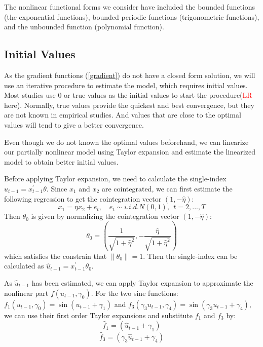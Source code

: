 \documentclass[a4paper,12pt,times,numbered,print,index]{report}
\numberwithin{equation}{section}
\begin{document}
The nonlinear functional forms we consider have included the bounded functions (the exponential functions), bounded periodic functions (trigonometric functions), and the unbounded function (polynomial function). 

\subsection{Initial Values}

As the gradient functions (\ref{gradient}) do not have a closed form solution, we will use an iterative procedure to estimate the model, which requires initial values. Most studies use 0 or true values as the initial values to start the procedure(\textcolor{red}{LR} here). Normally, true values provide the quickest and best convergence, but they are not known in empirical studies. And values that are close to the optimal values will tend to give a better convergence. 

Even though we do not known the optimal values beforehand, we can linearize our partially nonlinear model using Taylor expansion and estimate the linearized model to obtain better initial values. 


Before applying Taylor expansion, we need to calculate the single-index $u_{t-1} = x^{\prime}_{t-1}\theta$. Since $x_1$ and $x_2$ are cointegrated, we can first estimate the following regression to get the cointegration vector $(1,-\hat{\eta})$:
$$
x_1 =\eta x_2 + e_t, \quad e_{t}\sim i.i.d.N\left( 0,1\right) ,\ \ t=2,...,T
$$
Then $\theta_0$ is given by normalizing the cointegration vector $(1,-\hat{\eta})$:
$$
\theta_{0} = (\dfrac{1}{\sqrt{1+\hat{\eta}^2}}, -\dfrac{\hat{\eta}}{\sqrt{1+\hat{\eta}^2}})
$$
which satisfies the constrain that $\|\theta_0\| = 1$. Then the single-index can be calculated as $\hat{u}_{t-1} = x^{\prime}_{t-1}\theta_0$.


As $\hat{u}_{t-1}$ has been estimated, we can apply Taylor expansion to approximate the nonlinear part $f\left( \hat{u}_{t-1},\gamma _{0}\right)$. For the two sine functions: $f_{1}\left( u_{t-1},\gamma _{0}\right) =\sin \left( u_{t-1}+\gamma_{1}\right)$ and $f_{3}\left( \gamma_{3}u_{t-1},\gamma _{4}\right) =\sin \left( \gamma_{3}u_{t-1}+\gamma_{4}\right)$, we can use their first order Taylor expansions and substitute $f_1$ and $f_3$ by: 
$$
\tilde{f_1} = \left( \hat{u}_{t-1}+\gamma_{1}\right) 
$$ 
$$
\tilde{f_3} = \left( \gamma_{3}\hat{u}_{t-1}+\gamma_{4}\right) 
$$ 
\end{document}
